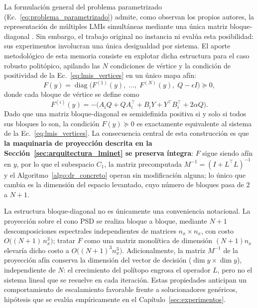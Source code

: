 La formulación general del problema parametrizado 
(Ec.~\eqref{eq:problema_parametrizado}) admite, como observan los propios autores, la 
representación de múltiples LMIs simultáneas mediante una única matriz bloque-diagonal 
\cite{tang2026lminet}. Sin embargo, el trabajo original no instancia ni evalúa esta 
posibilidad: sus experimentos involucran una única desigualdad por sistema. El aporte 
metodológico de esta memoria consiste en explotar dicha estructura para el caso 
robusto politópico, apilando las $N$ condiciones de vértice y la condición de 
positividad de la Ec.~\eqref{eq:lmis_vertices} en un único mapa afín:
\begin{equation}
    F(y) = \operatorname{diag}\Big( 
        F^{(1)}(y),\; \dots,\; F^{(N)}(y),\; Q - \epsilon I 
    \Big) \succeq 0,
    \label{eq:F_politopica}
\end{equation}
donde cada bloque de vértice se define como
\begin{equation}
    F^{(i)}(y) = -\big( A_i Q + Q A_i^\top + B_i Y + Y^\top B_i^\top + 2\alpha Q \big).
    \label{eq:bloque_vertice_lpv}
\end{equation}
Dado que una matriz bloque-diagonal es semidefinida positiva si y solo si todos sus 
bloques lo son, la condición $F(y) \succeq 0$ es exactamente equivalente al sistema de 
la Ec.~\eqref{eq:lmis_vertices}. La consecuencia central de esta construcción es que 
\textbf{la maquinaria de proyección descrita en la 
Sección~\ref{sec:arquitectura_lminet} se preserva íntegra}: $F$ sigue siendo afín en 
$y$, por lo que el subespacio $C_1$, la matriz precomputada 
$M^{-1} = (I + L^\top L)^{-1}$ y el Algoritmo~\ref{algo:dr_concreto} operan sin 
modificación alguna; lo único que cambia es la dimensión del espacio levantado, cuyo 
número de bloques pasa de $2$ a $N+1$.

La estructura bloque-diagonal no es únicamente una conveniencia notacional. La proyección sobre el cono PSD se realiza bloque a bloque, 
mediante $N+1$ descomposiciones espectrales independientes de matrices $n_x \times 
n_x$, con costo $O\big((N+1)\, n_x^3\big)$; tratar $F$ como una matriz monolítica de 
dimensión $(N+1)n_x$ elevaría dicho costo a $O\big((N+1)^3 n_x^3\big)$. 
Adicionalmente, la matriz $M^{-1}$ de la proyección afín conserva la dimensión del 
vector de decisión ($\dim y \times \dim y$), independiente de $N$: el crecimiento del 
polítopo engrosa el operador $L$, pero no el sistema lineal que se resuelve en cada 
iteración. Estas propiedades anticipan un comportamiento de escalamiento favorable 
frente a solucionadores genéricos, hipótesis que se evalúa empíricamente en el 
Capítulo~\ref{sec:experimentos}.












